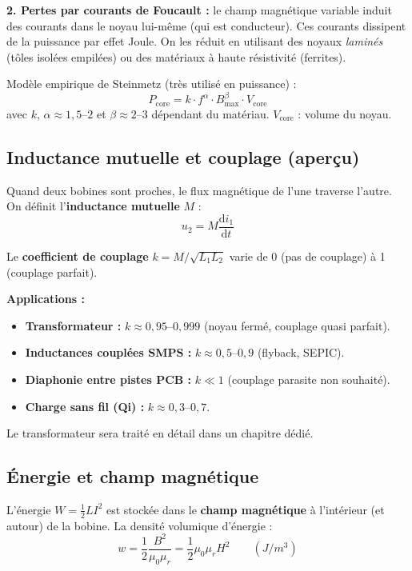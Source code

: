\documentclass[12pt,a4paper,twoside]{book}
\begin{document}
\textbf{2. Pertes par courants de Foucault :} le champ magnétique variable induit des courants dans le noyau lui-même (qui est conducteur). Ces courants dissipent de la puissance par effet Joule. On les réduit en utilisant des noyaux \textit{laminés} (tôles isolées empilées) ou des matériaux à haute résistivité (ferrites).

\begin{formule}
Modèle empirique de Steinmetz (très utilisé en puissance) :
\[
\boxed{P_{\text{core}} = k \cdot f^\alpha \cdot B_{\text{max}}^\beta \cdot V_{\text{core}}}
\]
avec $k$, $\alpha \approx 1{,}5$--$2$ et $\beta \approx 2$--$3$ dépendant du matériau. $V_{\text{core}}$ : volume du noyau.
\end{formule}

\subsection{Inductance mutuelle et couplage (aperçu)}

Quand deux bobines sont proches, le flux magnétique de l'une traverse l'autre. On définit l'\textbf{inductance mutuelle} $M$ :
\[
u_2 = M \frac{\mathrm{d}i_1}{\mathrm{d}t}
\]

Le \textbf{coefficient de couplage} $k = M/\sqrt{L_1 L_2}$ varie de 0 (pas de couplage) à 1 (couplage parfait).

\begin{pratique}
\textbf{Applications :}
\begin{itemize}[nosep]
\item \textbf{Transformateur :} $k \approx 0{,}95$--$0{,}999$ (noyau fermé, couplage quasi parfait).
\item \textbf{Inductances couplées SMPS :} $k \approx 0{,}5$--$0{,}9$ (flyback, SEPIC).
\item \textbf{Diaphonie entre pistes PCB :} $k \ll 1$ (couplage parasite non souhaité).
\item \textbf{Charge sans fil (Qi) :} $k \approx 0{,}3$--$0{,}7$.
\end{itemize}
Le transformateur sera traité en détail dans un chapitre dédié.
\end{pratique}

\subsection{Énergie et champ magnétique}

L'énergie $W = \frac{1}{2}LI^2$ est stockée dans le \textbf{champ magnétique} à l'intérieur (et autour) de la bobine. La densité volumique d'énergie :
\[
w = \frac{1}{2}\frac{B^2}{\mu_0 \mu_r} = \frac{1}{2}\mu_0\mu_r H^2 \qquad (\si{J/m^3})
\]
\end{document}
